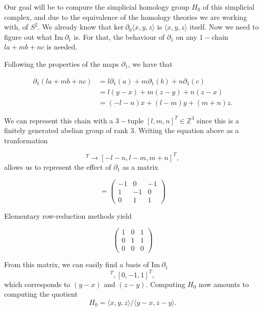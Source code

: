 Our goal will be to compure the simplicial homology group $H_{0}$ of this simplicial complex, and due to the equivalence of the homology theories we are working with, of $S^{2}$. We already know that $\text{ker}\:\partial_{0}\langle x,y,z \rangle$ is $\langle x,y,z \rangle$ itself. Now we need to figure out what $\text{Im}\:\partial_{1}$ is. For that, the behaviour of $\partial_{1}$ on any $1-$chain $la + mb + nc$ is needed.

Following the properties of the maps $\partial_{1}$, we have that

\begin{align*}
  \partial_{1}(la + mb + nc) &= l\partial_{1}(a) + m\partial_{1}(b) + n\partial_{1}(c) \\
                             &= l(y-x) + m(z-y) + n(z-x) \\
                             &= (-l-n)x + (l-m)y + (m+n)z.
\end{align*}

We can represent this chain with a $3-$tuple $[l,m,n]^{T} \in \mathbb{Z}^{3}$ since this is a finitely generated abelian group of rank $3$. Writing the equation above as a tranformation

\begin{equation*}
  [l,m,n]^{T} \to [-l-n,l-m,m+n]^{T},
\end{equation*}
\noindent
allows us to represent the effect of $\partial_{1}$ as a matrix

\begin{equation*}
  [\partial_{1}] =
  \begin{pmatrix}
    -1 & 0 & -1 \\
    1 & -1 & 0 \\
    0 & 1 & 1
  \end{pmatrix}
\end{equation*}

Elementary row-reduction methods yield

\begin{equation*}
  \begin{pmatrix}
    1 & 0 & 1 \\
    0 & 1 & 1 \\
    0 & 0 & 0
  \end{pmatrix}
\end{equation*}

From this matrix, we can easily find a basis of $\text{Im}\:\partial_{1}$
\begin{equation*}
  [-1,1,0]^{T}, [0, -1, 1]^{T},
\end{equation*}
which corresponds to $(y-x)$ and $(z-y)$. Computing $H_{0}$ now amounts to computing the quotient
\begin{equation*}
  H_{0} = \langle x,y,z \rangle / \langle y-x, z-y \rangle.
\end{equation*}

